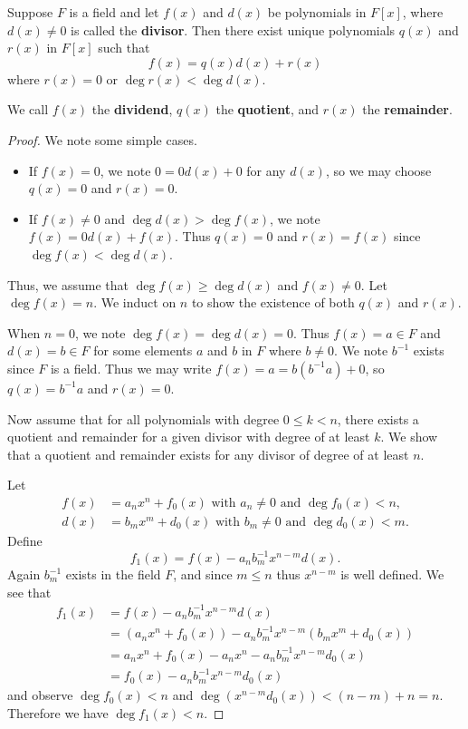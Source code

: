 \begin{theorem}\label{thrm-polynomial-long-division}
    Suppose $F$ is a field and let $f(x)$ and $d(x)$ be polynomials in $F[x]$, where $d(x) \neq 0$ is called the \textbf{divisor}. Then there exist unique polynomials $q(x)$ and $r(x)$ in $F[x]$ such that
    \[
        f(x) = q(x)d(x) + r(x)
    \]
    where $r(x) = 0$ or $\deg r(x) < \deg d(x)$.

    We call $f(x)$ the \textbf{dividend}, $q(x)$ the \textbf{quotient}, and $r(x)$ the \textbf{remainder}.
\end{theorem}
\begin{proof}
    We note some simple cases.
    \begin{itemize}
        \item If $f(x) = 0$, we note $0 = 0d(x) + 0$ for any $d(x)$, so we may choose $q(x) = 0$ and $r(x) = 0$.
        \item If $f(x) \neq 0$ and $\deg d(x) > \deg f(x)$, we note $f(x) = 0d(x) + f(x)$. Thus $q(x) = 0$ and $r(x) = f(x)$ since $\deg f(x) < \deg d(x)$.
    \end{itemize}

    Thus, we assume that $\deg f(x) \geq \deg d(x)$ and $f(x) \neq 0$. Let $\deg f(x) = n$. We induct on $n$ to show the existence of both $q(x)$ and $r(x)$.

    When $n = 0$, we note $\deg f(x) = \deg d(x) = 0$. Thus $f(x) = a \in F$ and $d(x) = b \in F$ for some elements $a$ and $b$ in $F$ where $b \neq 0$. We note $b^{-1}$ exists since $F$ is a field. Thus we may write $f(x) = a = b(b^{-1}a) + 0$, so $q(x) = b^{-1}a$ and $r(x) = 0$.

    Now assume that for all polynomials with degree $0 \leq k < n$, there exists a quotient and remainder for a given divisor with degree of at least $k$. We show that a quotient and remainder exists for any divisor of degree of at least $n$.

    Let
    \begin{align*}
        f(x) &= a_nx^n + f_0(x) \text{ with } a_n \neq 0 \text{ and } \deg f_0(x) < n,\\
        d(x) &= b_mx^m + d_0(x) \text{ with } b_m \neq 0 \text{ and } \deg d_0(x) < m.
    \end{align*}
    Define
    \[
        f_1(x) = f(x) - a_nb_m^{-1}x^{n-m}d(x).
    \]
    Again $b_m^{-1}$ exists in the field $F$, and since $m \leq n$ thus $x^{n-m}$ is well defined. We see that
    \begin{align*}
        f_1(x) &= f(x) - a_nb_m^{-1}x^{n-m}d(x)\\
        &= (a_nx^n + f_0(x)) - a_nb_m^{-1}x^{n-m}\left(b_mx^m + d_0(x)\right)\\
        &= a_nx^n + f_0(x) - a_nx^n - a_nb_m^{-1}x^{n-m}d_0(x)\\
        &= f_0(x) - a_nb_m^{-1}x^{n-m}d_0(x)
    \end{align*}
    and observe $\deg f_0(x) < n$ and $\deg(x^{n-m}d_0(x)) < (n-m) + n = n$. Therefore we have $\deg f_1(x) < n$.


\end{proof}

